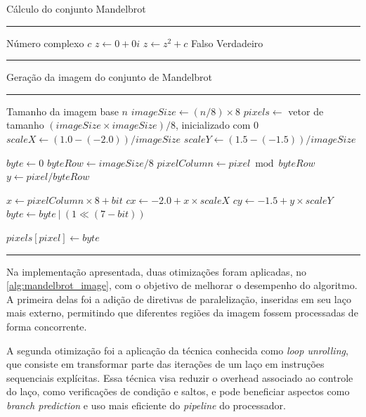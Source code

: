 \begin{algorithm}[htb]
	\caption{Cálculo do conjunto Mandelbrot}
	\label{alg:mandelbrot}
	\hrule
	\begin{algorithmic}[1]
		\REQUIRE Número complexo $c$
		\STATE $z \gets 0 + 0i$
		\STATE $z \gets z^2 + c$
		\RETURN Falso
		\ENDIF
		\ENDFOR
		\RETURN Verdadeiro
	\end{algorithmic}
	\hrule
	\fonte{}
\end{algorithm}

\begin{algorithm}[htb]
	\caption{Geração da imagem do conjunto de Mandelbrot}
	\label{alg:mandelbrot_image}
	\hrule
	\begin{algorithmic}[1]
		\REQUIRE Tamanho da imagem base $n$
		\STATE $imageSize \gets (n / 8) \times 8$
		\STATE $pixels \gets$ vetor de tamanho $(imageSize \times imageSize) / 8$, inicializado com $0$
		\STATE $scaleX \gets (1.0 - (-2.0)) / imageSize$
		\STATE $scaleY \gets (1.5 - (-1.5)) / imageSize$

		\STATE $byte \gets 0$
		\STATE $byteRow \gets imageSize / 8$
		\STATE $pixelColumn \gets pixel \bmod byteRow$
		\STATE $y \gets pixel / byteRow$

		\STATE $x \gets pixelColumn \times 8 + bit$
		\STATE $cx \gets -2.0 + x \times scaleX$
		\STATE $cy \gets -1.5 + y \times scaleY$
		\STATE $byte \gets byte\ |\ (1 \ll (7 - bit))$
		\ENDIF
		\ENDFOR

		\STATE $pixels[pixel] \gets byte$
		\ENDFOR
	\end{algorithmic}
	\hrule
	\fonte{}
\end{algorithm}

Na implementação apresentada, duas otimizações foram aplicadas, no \autoref{alg:mandelbrot_image}, com o objetivo de melhorar o desempenho do algoritmo. A primeira delas foi a adição de diretivas de paralelização, inseridas em seu laço mais externo, permitindo que diferentes regiões da imagem fossem processadas de forma concorrente.

A segunda otimização foi a aplicação da técnica conhecida como \textit{loop unrolling}, que consiste em transformar parte das iterações de um laço em instruções sequenciais explícitas. Essa técnica visa reduzir o overhead associado ao controle do laço, como verificações de condição e saltos, e pode beneficiar aspectos como \textit{branch prediction} e uso mais eficiente do \textit{pipeline} do processador.

